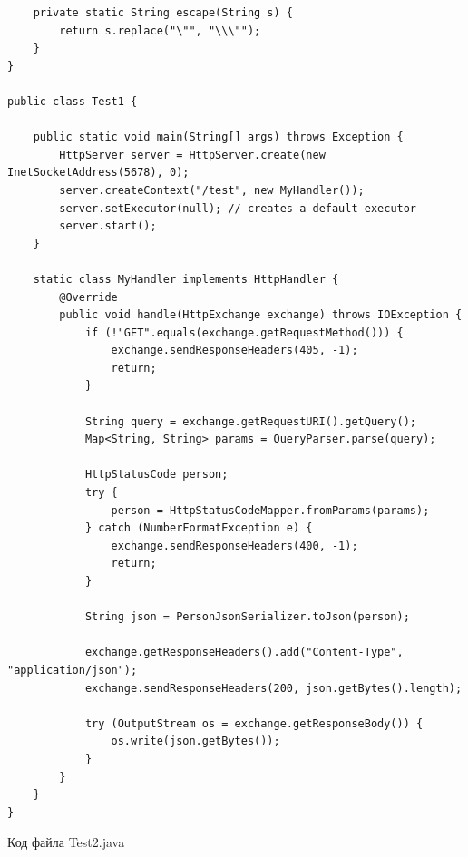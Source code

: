 \documentclass[a4paper, 14pt]{extarticle}
\begin{document}
\begin{lstlisting}
    private static String escape(String s) {
        return s.replace("\"", "\\\"");
    }
}

public class Test1 {

    public static void main(String[] args) throws Exception {
        HttpServer server = HttpServer.create(new InetSocketAddress(5678), 0);
        server.createContext("/test", new MyHandler());
        server.setExecutor(null); // creates a default executor
        server.start();
    }

    static class MyHandler implements HttpHandler {
        @Override
        public void handle(HttpExchange exchange) throws IOException {
            if (!"GET".equals(exchange.getRequestMethod())) {
                exchange.sendResponseHeaders(405, -1);
                return;
            }

            String query = exchange.getRequestURI().getQuery();
            Map<String, String> params = QueryParser.parse(query);

            HttpStatusCode person;
            try {
                person = HttpStatusCodeMapper.fromParams(params);
            } catch (NumberFormatException e) {
                exchange.sendResponseHeaders(400, -1);
                return;
            }

            String json = PersonJsonSerializer.toJson(person);

            exchange.getResponseHeaders().add("Content-Type", "application/json");
            exchange.sendResponseHeaders(200, json.getBytes().length);

            try (OutputStream os = exchange.getResponseBody()) {
                os.write(json.getBytes());
            }
        }
    }
}
\end{lstlisting}
\par
Код файла Test2.java
\end{document}
